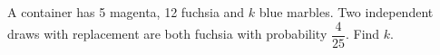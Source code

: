 A container has 5 magenta, 12 fuchsia and $k$ blue marbles. Two independent draws with replacement are both fuchsia with probability $\dfrac{4}{25}$. Find $k$.
